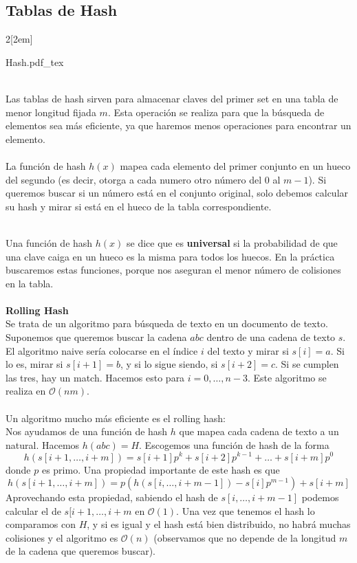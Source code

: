 \documentclass[leqno]{article}
\newcommand{\incfig}[1]{%
  \begin{center}
  \def\svgwidth{0.9\columnwidth}
  {#1.pdf_tex}
  \end{center}
}
\begin{document}
\subsection{Tablas de Hash}
\begin{multicols}{2}[\columnsep2em]
\incfig{Hash} 
\columnbreak \\
Las tablas de hash sirven para almacenar claves del primer set en una tabla de menor longitud fijada $m$. Esta operación se realiza para que la búsqueda de elementos sea más eficiente, ya que haremos menos operaciones para encontrar un elemento. \\
\\
La función de hash  $h(x)$ mapea cada elemento del primer conjunto en un hueco del segundo (es decir, otorga a cada numero otro número del $0$ al  $m-1$). Si queremos buscar si un número está en el conjunto original, solo debemos calcular su hash y mirar si está en el hueco de la tabla correspondiente. \\
\end{multicols}
\\
\noindent
Una función de hash $h(x)$ se dice que es  \textbf{universal} si la probabilidad de que una clave caiga en un hueco es la misma para todos los huecos. En la práctica buscaremos estas funciones, porque nos aseguran el menor número de colisiones en la tabla.\\
\\
\textbf{Rolling Hash}\\
Se trata de un algoritmo para búsqueda de texto en un documento de texto. Suponemos que queremos buscar la cadena $abc$ dentro de una cadena de texto $s$. El algoritmo naive sería colocarse en el índice $i$ del texto y mirar si $s[i]=a$. Si lo es, mirar si $s[i+1]=b$, y si lo sigue siendo, si $s[i+2]=c$. Si se cumplen las tres, hay un match. Hacemos esto para $i = 0, \ldots , n-3$. Este algoritmo se realiza en $\mathcal{O}(nm)$.\\
\\
Un algoritmo mucho más eficiente es el rolling hash:\\
Nos ayudamos de una función de hash $h$ que mapea cada cadena de texto a un natural. Hacemos $h(abc)=H$. Escogemos una función de hash de la forma
\[
h(s[i+1,\ldots, i+m]) = s[i+1]p^k + s[i+2]p^{k-1} + \ldots + s[i+m]p^0
\] 
donde $p$ es primo. Una propiedad importante de este hash es que 
\[
h(s[i+1, \ldots, i+m]) = p(h(s[i, \ldots, i+m-1])-s[i]p^{m-1}) + s[i+m]
\]
Aprovechando esta propiedad, sabiendo el hash de $s[i, \ldots, i+m-1]$ podemos calcular el de  $s[i+1, \ldots, i+m$ en $\mathcal{O}(1)$. Una vez que tenemos el hash lo comparamos con $H$, y si es igual y el hash está bien distribuido, no habrá muchas colisiones y el algoritmo es  $\mathcal{O}(n)$ (observamos que no depende de la longitud $m$ de la cadena que queremos buscar). \\
\end{document}
